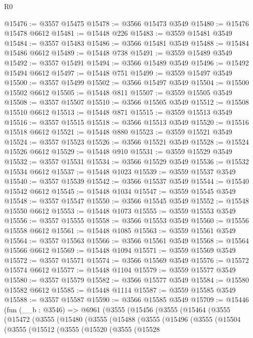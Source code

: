 \begin{lexlean}{R0}
\begin{coremodule}
@15476 := @3557 @15475
@15478 := @3566 @15473 @3549
@15480 := @15476 @15478 @6612
@15481 := @15448 @226
@15483 := @3559 @15481 @3549
@15484 := @3557 @15483
@15486 := @3566 @15481 @3549
@15488 := @15484 @15486 @6612
@15489 := @15448 @738
@15491 := @3559 @15489 @3549
@15492 := @3557 @15491
@15494 := @3566 @15489 @3549
@15496 := @15492 @15494 @6612
@15497 := @15448 @751
@15499 := @3559 @15497 @3549
@15500 := @3557 @15499
@15502 := @3566 @15497 @3549
@15504 := @15500 @15502 @6612
@15505 := @15448 @811
@15507 := @3559 @15505 @3549
@15508 := @3557 @15507
@15510 := @3566 @15505 @3549
@15512 := @15508 @15510 @6612
@15513 := @15448 @871
@15515 := @3559 @15513 @3549
@15516 := @3557 @15515
@15518 := @3566 @15513 @3549
@15520 := @15516 @15518 @6612
@15521 := @15448 @880
@15523 := @3559 @15521 @3549
@15524 := @3557 @15523
@15526 := @3566 @15521 @3549
@15528 := @15524 @15526 @6612
@15529 := @15448 @910
@15531 := @3559 @15529 @3549
@15532 := @3557 @15531
@15534 := @3566 @15529 @3549
@15536 := @15532 @15534 @6612
@15537 := @15448 @1023
@15539 := @3559 @15537 @3549
@15540 := @3557 @15539
@15542 := @3566 @15537 @3549
@15544 := @15540 @15542 @6612
@15545 := @15448 @1034
@15547 := @3559 @15545 @3549
@15548 := @3557 @15547
@15550 := @3566 @15545 @3549
@15552 := @15548 @15550 @6612
@15553 := @15448 @1073
@15555 := @3559 @15553 @3549
@15556 := @3557 @15555
@15558 := @3566 @15553 @3549
@15560 := @15556 @15558 @6612
@15561 := @15448 @1085
@15563 := @3559 @15561 @3549
@15564 := @3557 @15563
@15566 := @3566 @15561 @3549
@15568 := @15564 @15566 @6612
@15569 := @15448 @1094
@15571 := @3559 @15569 @3549
@15572 := @3557 @15571
@15574 := @3566 @15569 @3549
@15576 := @15572 @15574 @6612
@15577 := @15448 @1104
@15579 := @3559 @15577 @3549
@15580 := @3557 @15579
@15582 := @3566 @15577 @3549
@15584 := @15580 @15582 @6612
@15585 := @15448 @1114
@15587 := @3559 @15585 @3549
@15588 := @3557 @15587
@15590 := @3566 @15585 @3549
@15709 := @15446
    (fun (__b : @3546) =>
    @6961
      (@3555
        (@15456
          (@3555
            (@15464
              (@3555
                (@15472
                  (@3555
                    (@15480
                      (@3555
                        (@15488
                          (@3555
                            (@15496
                              (@3555
                                (@15504
                                  (@3555
                                    (@15512
                                      (@3555
                                        (@15520
                                          (@3555
                                            (@15528

\end{coremodule}
\end{lexlean}

